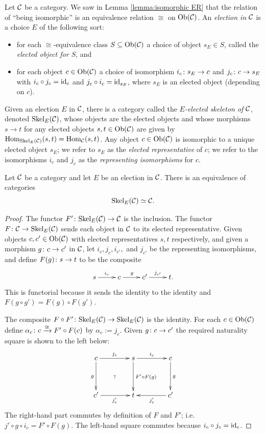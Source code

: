 \begin{definition}[Skeleton]

Let $\mathcal{C}$ be a category. We saw in Lemma \ref{lemma:isomorphic ER} that the relation of “being isomorphic” is an equivalence relation $\cong$ on $\textnormal{Ob}(\mathcal{C})$. An {\em election in $\mathcal{C}$} is a choice $E$ of the following sort:
\begin{itemize}
\item for each $\cong$-equivalence class $S\subseteq\textnormal{Ob}(\mathcal{C})$ a choice of object $s_E\in S$, called the {\em elected object for $S$}, and
\item for each object $c\in\textnormal{Ob}(\mathcal{C})$ a choice of isomorphism $i_c\colon s_E\rightarrow c$ and $j_c\colon c\rightarrow s_E$ with $i_c\circ j_c=\textnormal{id}_c$ and $j_c\circ i_c=\textnormal{id}_{s_E}$, where $s_E$ is an elected object (depending on $c$).
\end{itemize}
Given an election $E$ in $\mathcal{C}$, there is a category called the {\em $E$-elected skeleton of $\mathcal{C}$}, denoted $\textnormal{Skel}_E(\mathcal{C})$, whose objects are the elected objects and whose morphisms $s\to t$ for any elected objects $s,t\in\textnormal{Ob}(\mathcal{C})$ are given by $\textnormal{Hom}_{\textnormal{Skel}_E(\mathcal{C})}(s,t)=\textnormal{Hom}_\mathcal{C}(s,t)$. Any object $c\in\textnormal{Ob}(\mathcal{C})$ is isomorphic to a unique elected object $s_E$; we refer to $s_E$ as the {\em elected representative} of $c$; we refer to the isomorphisms $i_c$ and $j_c$ as the {\em representing isomorphisms} for $c$.

\end{definition}

\begin{proposition}

Let $\mathcal{C}$ be a category and let $E$ be an election in $\mathcal{C}$. There is an equivalence of categories $$\textnormal{Skel}_E(\mathcal{C})\simeq\mathcal{C}.$$

\end{proposition}

\begin{proof}

The functor $F'\colon\textnormal{Skel}_E(\mathcal{C})\rightarrow\mathcal{C}$ is the inclusion. The functor $F\colon\mathcal{C}\rightarrow\textnormal{Skel}_E(\mathcal{C})$ sends each object in $\mathcal{C}$ to its elected representative. Given objects $c,c'\in\textnormal{Ob}(\mathcal{C})$ with elected representatives $s,t$ respectively, and given a morphism $g\colon c\rightarrow c'$ in $\mathcal{C}$, let $i_c,j_c,i_{c'},$ and $j_{c'}$ be the representing isomorphisms, and define $F(g)\colon s\rightarrow t$ to be the composite 
$$\xymatrix{s\ar[r]^{i_c}&c\ar[r]^g&c'\ar[r]^{j_{c'}}&t.}$$
This is functorial because it sends the identity to the identity and $F(g\circ g')=F(g)\circ F(g')$.

The composite $F\circ F'\colon\textnormal{Skel}_E(\mathcal{C})\rightarrow\textnormal{Skel}_E(\mathcal{C})$ is the identity. For each $c\in\textnormal{Ob}(\mathcal{C})$ define $\alpha_c\colon c\xrightarrow{\cong} F'\circ F(c)$ by  $\alpha_c:=j_c$. Given $g\colon c\rightarrow c'$ the required naturality square is shown to the left below:
$$
\xymatrix@=40pt{
c\ar[r]^{j_c}\ar[d]_{g}\ar@{}[dr]|{?}&s\ar[r]^{i_c}\ar[d]^{F'\circ F(g)}&c\ar[d]^g\\
c'\ar[r]_{j_c'}&t&c'\ar[l]^{j_c'}}
$$
The right-hand part commutes by definition of $F$ and $F'$; i.e. $j'\circ g\circ i_c=F'\circ F(g)$. The left-hand square commutes because $i_c\circ j_c=\textnormal{id}_c$.

\end{proof}

